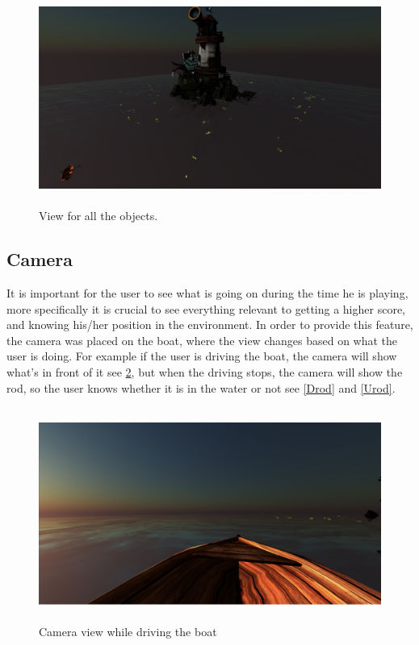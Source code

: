 \documentclass[paper=a4, fontsize=11pt]{scrartcl} %
\numberwithin{equation}{section} %
\numberwithin{figure}{section} %
\numberwithin{table}{section} %
\begin{document}
\begin{figure}[!ht]
\centering
\includegraphics[width=15cm, height=7cm]{images/lighthouse.png}
\caption{View for all the objects.}
\label{house}
\end{figure}

\subsection{Camera}

It is important for the user to see what is going on during the time he is playing, more specifically it is crucial to see everything relevant to getting a higher score, and knowing his/her position in the environment. In order to provide this feature, the camera was placed on the boat, where the view changes based on what the user is doing. For example if the user is driving the boat, the camera will show what's in front of it see \ref{boat view}, but when the driving stops, the camera will show the rod, so the user knows whether it is in the water or not see \ref{Drod} and \ref{Urod}.

\begin{figure}[!ht]
\centering
\includegraphics[width=15cm, height=7cm]{images/boatview.png}
\caption{Camera view while driving the boat}
\label{boat view}
\end{figure}
\end{document}
